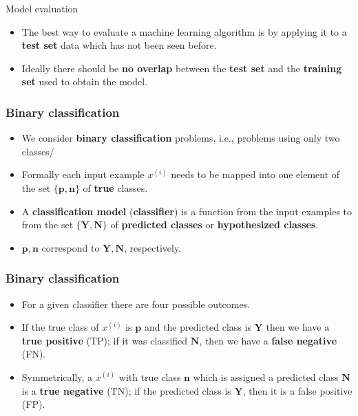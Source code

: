 \documentclass[notes]{beamer}          %
\newcommand{\vect}[1]{\bm{#1}}
\begin{document}
\begin{frame}{Model evaluation}
    \begin{itemize}
        \item The best way to evaluate a machine learning algorithm is by applying it to a {\bf test set} data which has not been seen before.
        \item Ideally there should be {\bf no overlap} between the {\bf test set} and  the {\bf training set} used to obtain the model.
    \end{itemize}
\end{frame}

\begin{frame}\frametitle{Binary classification}
    \begin{itemize}
        \item We consider {\bf binary classification} problems, i.e., problems using only two classes/
        \item Formally each input example $x^{(i)}$ needs to be mapped into one element of the set $\{\vect{p},\vect{n}\}$ of {\bf true} classes.
        \item A {\bf classification model} ({\bf classifier}) is a function from the input examples to  from the set $\{\vect{Y}, \vect{N}\}$ of {\bf predicted classes} or {\bf hypothesized classes}.
        \item $\vect{p},\vect{n}$ correspond to $\vect{Y},\vect{N}$, respectively.
    \end{itemize}
\end{frame}


\begin{frame}\frametitle{Binary classification}
    \begin{itemize}
        \item For a given classifier there are four possible outcomes.
        \item If the true class of $x^{(i)}$ is $\vect{p}$ and the predicted class is $\vect{Y}$ then we have a {\bf true positive} (TP); if it was classified $\vect{N}$, then we have a {\bf false negative} (FN).
        \item Symmetrically, a  $x^{(i)}$ with true class $\vect{n}$ which is assigned a predicted class $\vect{N}$ is a {\bf true negative} (TN); if the predicted class is $\vect{Y}$, then it is a false positive (FP).
    \end{itemize}
\end{frame}
\end{document}
